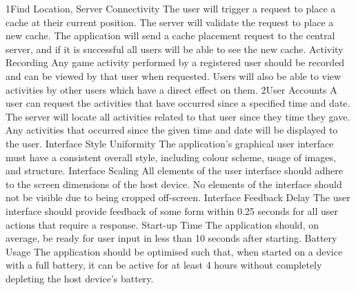 			{1}{Find Location, Server Connectivity}
			{The user will trigger a request to place a cache at their current 
			position.}
			{The server will validate the request to place a new cache.}
			{The application will send a cache placement request to the 
			central server, and if it is successful all users will be able to 
			see the new cache.}
		\funcreq %
			{Activity Recording}
			{Any game activity performed by a registered user should be
			recorded and can be viewed by that user when requested. Users will
			also be able to view activities by other users which have a direct
			effect on them.}
			{2}{User Accounts}
			{A user can request the activities that have occurred since a
			specified time and date.}
			{The server will locate all activities related to that user since
			they time they gave.}
			{Any activities that occurred since the given time and date will
			be displayed to the user.}
		\nonfuncreq %
			{Interface Style Uniformity}
			{The application's graphical user interface must have a consistent
			overall style, including colour scheme, usage of images, and
			structure.}
		\nonfuncreq %
			{Interface Scaling}
			{All elements of the user interface should adhere to the screen
			dimensions of the host device. No elements of the interface should
			not be visible due to being cropped off-screen.}
		\nonfuncreq %
			{Interface Feedback Delay}
			{The user interface should provide feedback of some form within
			0.25 seconds for all user actions that require a response.}
		\nonfuncreq %
			{Start-up Time}
			{The application should, on average, be ready for user input in
			less than 10 seconds after starting.}
		\nonfuncreq %
			{Battery Usage}
			{The application should be optimised such that, when started on a
			device with a full battery, it can be active for at least 4 hours
			without completely depleting the host device's battery.}
